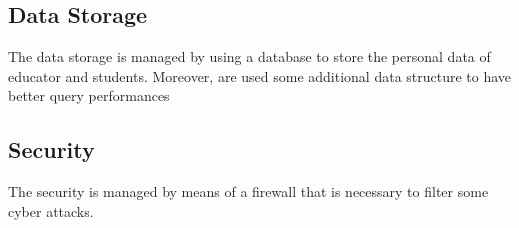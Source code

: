 \subsection{Data Storage}
The data storage is managed by using a database to store  the personal data of educator and students. Moreover, are used some additional data structure to have better query performances 

\subsection{Security}
The security is managed by means of a firewall that is necessary to filter some cyber attacks.


